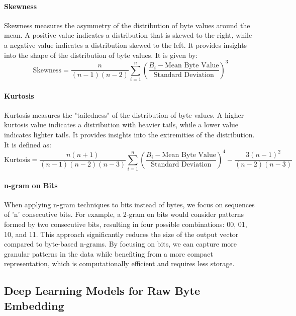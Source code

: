         \paragraph{Skewness}Skewness measures the asymmetry of the distribution of byte values around the mean. A positive value indicates a distribution that is skewed to the right, while a negative value indicates a distribution skewed to the left. It provides insights into the shape of the distribution of byte values. It is given by:
        \begin{equation}
        \text{Skewness} = \frac{n}{(n-1)(n-2)} \sum_{i=1}^{n} \left( \frac{B_i - \text{Mean Byte Value}}{\text{Standard Deviation}} \right)^3
        \label{eq:skewness}
        \end{equation}

        \paragraph{Kurtosis}Kurtosis measures the "tailedness" of the distribution of byte values. A higher kurtosis value indicates a distribution with heavier tails, while a lower value indicates lighter tails. It provides insights into the extremities of the distribution. It is defined as:
        \begin{equation}
        \text{Kurtosis} = \frac{n(n+1)}{(n-1)(n-2)(n-3)} \sum_{i=1}^{n} \left( \frac{B_i - \text{Mean Byte Value}}{\text{Standard Deviation}} \right)^4 - \frac{3(n-1)^2}{(n-2)(n-3)}
        \label{eq:kurtosis}
        \end{equation}

        \paragraph{n-gram on Bits}When applying n-gram techniques to bits instead of bytes, we focus on sequences of 'n' consecutive bits. For example, a 2-gram on bits would consider patterns formed by two consecutive bits, resulting in four possible combinations: 00, 01, 10, and 11. This approach significantly reduces the size of the output vector compared to byte-based n-grams. By focusing on bits, we can capture more granular patterns in the data while benefiting from a more compact representation, which is computationally efficient and requires less storage.

\subsection{Deep Learning Models for Raw Byte Embedding}

